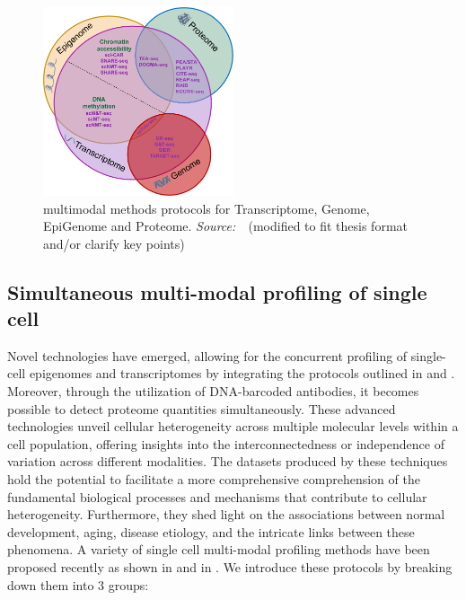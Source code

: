 \begin{figure}[!ht]
	\centering
	\includegraphics[width=0.50\textwidth]{multi-model-methods/fig}
	\vspace{0.1cm}
	\caption[multimodal methods protocols for Transcriptome, Genome, EpiGenome and Proteome]{multimodal methods protocols for Transcriptome, Genome, EpiGenome and Proteome. \emph{Source:~\cite{lee2020single}}~(modified to fit thesis format and/or clarify key points)}
	\label{fig:piechart-mulitmodal-methods}
\end{figure}



\subsection{Simultaneous multi-modal profiling of single cell}
\label{background:sec1:mulitmodal}
Novel technologies have emerged, allowing for the concurrent profiling of single-cell epigenomes and transcriptomes by integrating the protocols outlined in  and . Moreover, through the utilization of DNA-barcoded antibodies, it becomes possible to detect proteome quantities simultaneously. These advanced technologies unveil cellular heterogeneity across multiple molecular levels within a cell population, offering insights into the interconnectedness or independence of variation across different modalities. The datasets produced by these techniques hold the potential to facilitate a more comprehensive comprehension of the fundamental biological processes and mechanisms that contribute to cellular heterogeneity. Furthermore, they shed light on the associations between normal development, aging, disease etiology, and the intricate links between these phenomena. A variety of single cell multi-modal profiling methods have been proposed recently as shown in  and in . We introduce these protocols by breaking down them into 3 groups:


